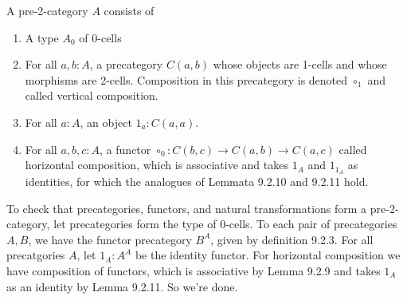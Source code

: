  \soln
A pre-2-category $A$ consists of
\begin{enumerate}
  \item A type $A_{0}$ of 0-cells
  \item For all $a, b : A$, a precategory $C(a, b)$ whose objects are 1-cells
  and whose morphisms are 2-cells.  Composition in this precategory is denoted
  $\circ_{1}$ and called vertical composition.
  \item For all $a : A$, an object $1_{a} : C(a, a)$.
  \item For all $a, b, c : A$, a functor $\circ_{0} : C(b, c) \to C(a, b) \to
  C(a, c)$ called horizontal composition, which is associative and takes
  $1_{A}$ and $1_{1_{A}}$ as identities, for which the analogues of Lemmata
  9.2.10 and 9.2.11 hold.
\end{enumerate}


To check that precategories, functors, and natural transformations form a
pre-2-category, let precategories form the type of 0-cells.  To each pair of
precategories $A, B$, we have the functor precategory $B^{A}$, given by
definition 9.2.3.  For all precatgories $A$, let $1_{A} : A^{A}$ be the
identity functor.  For horizontal composition we have composition of functors,
which is associative by Lemma 9.2.9 and takes $1_{A}$ as an identity by Lemma
9.2.11.  So we're done.


